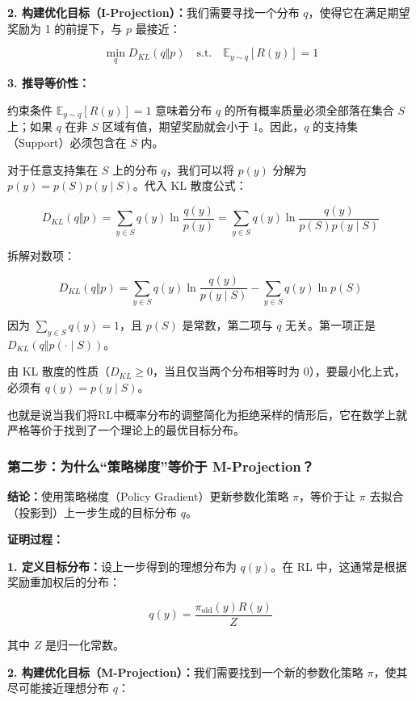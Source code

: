 \textbf{2. 构建优化目标（I-Projection）：}我们需要寻找一个分布 \(q\)，使得它在满足期望奖励为 1 的前提下，与 \(p\) 最接近：

\[
\min_q D_{KL}(q\Vert p) \quad \mathrm{s.t.}\quad \mathbb{E}_{y\sim q}[R(y)] = 1
\]

\textbf{3. 推导等价性：}

约束条件 \(\mathbb{E}_{y\sim q}[R(y)]=1\) 意味着分布 \(q\) 的所有概率质量必须全部落在集合 \(S\) 上；如果 \(q\) 在非 \(S\) 区域有值，期望奖励就会小于 1。因此，\(q\) 的支持集（Support）必须包含在 \(S\) 内。

对于任意支持集在 \(S\) 上的分布 \(q\)，我们可以将 \(p(y)\) 分解为 \(p(y)=p(S)p(y\mid S)\)。代入 KL 散度公式：

\[
D_{KL}(q\Vert p)
= \sum_{y\in S} q(y)\ln\frac{q(y)}{p(y)}
= \sum_{y\in S} q(y)\ln\frac{q(y)}{p(S)p(y\mid S)}
\]

拆解对数项：

\[
D_{KL}(q\Vert p)
= \sum_{y\in S} q(y)\ln\frac{q(y)}{p(y\mid S)}
- \sum_{y\in S} q(y)\ln p(S)
\]

因为 \(\sum_{y\in S}q(y)=1\)，且 \(p(S)\) 是常数，第二项与 \(q\) 无关。第一项正是 \(D_{KL}(q\Vert p(\cdot\mid S))\)。

由 KL 散度的性质（\(D_{KL}\ge 0\)，当且仅当两个分布相等时为 0），要最小化上式，必须有 \(q(y)=p(y\mid S)\)。

也就是说当我们将RL中概率分布的调整简化为拒绝采样的情形后，它在数学上就严格等价于找到了一个理论上的最优目标分布。

\hypertarget{ux7b2cux4e8cux6b65ux4e3aux4ec0ux4e48ux7b56ux7565ux68afux5ea6ux7b49ux4ef7ux4e8e-m-projection}{%
\subsubsection{第二步：为什么``策略梯度''等价于 M-Projection？}\label{ux7b2cux4e8cux6b65ux4e3aux4ec0ux4e48ux7b56ux7565ux68afux5ea6ux7b49ux4ef7ux4e8e-m-projection}}

\textbf{结论：}使用策略梯度（Policy Gradient）更新参数化策略 \(\pi\)，等价于让 \(\pi\) 去拟合（投影到）上一步生成的目标分布 \(q\)。

\textbf{证明过程：}

\textbf{1. 定义目标分布：}设上一步得到的理想分布为 \(q(y)\)。在 RL 中，这通常是根据奖励重加权后的分布：

\[
q(y)=\frac{\pi_{\mathrm{old}}(y)R(y)}{Z}
\]

其中 \(Z\) 是归一化常数。

\textbf{2. 构建优化目标（M-Projection）：}我们需要找到一个新的参数化策略 \(\pi\)，使其尽可能接近理想分布 \(q\)：

